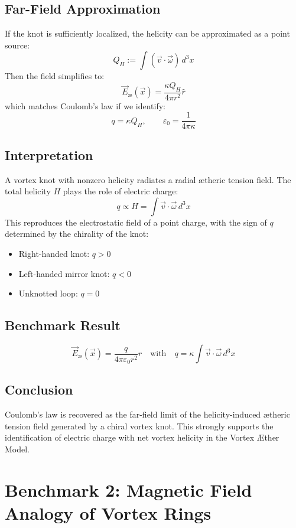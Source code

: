 \documentclass[preprint]{revtex4-2}
\begin{document}
\subsection*{Far-Field Approximation}
If the knot is sufficiently localized, the helicity can be approximated as a point source:
\[
Q_H := \int \left( \vec{v} \cdot \vec{\omega} \right) \, d^3x
\]
Then the field simplifies to:
\[
\vec{E}_\text{\ae}(\vec{x}) = \frac{\kappa Q_H}{4\pi r^2} \hat{r}
\]
which matches Coulomb's law if we identify:
\[
q = \kappa Q_H, \qquad \varepsilon_0 = \frac{1}{4\pi \kappa}
\]

\subsection*{Interpretation}
A vortex knot with nonzero helicity radiates a radial ætheric tension field. The total helicity $H$ plays the role of electric charge:
\[
q \propto H = \int \vec{v} \cdot \vec{\omega} \, d^3x
\]
This reproduces the electrostatic field of a point charge, with the sign of $q$ determined by the chirality of the knot:
\begin{itemize}
    \item Right-handed knot: $q > 0$
    \item Left-handed mirror knot: $q < 0$
    \item Unknotted loop: $q = 0$
\end{itemize}

\subsection*{Benchmark Result}
\[
\boxed{
\vec{E}_\text{\ae}(\vec{x}) =
\frac{q}{4\pi \varepsilon_0 r^2} \hat{r}
\quad \text{with} \quad
q = \kappa \int \vec{v} \cdot \vec{\omega} \, d^3x
}
\]

\subsection*{Conclusion}
Coulomb's law is recovered as the far-field limit of the helicity-induced ætheric tension field generated by a chiral vortex knot. This strongly supports the identification of electric charge with net vortex helicity in the Vortex Æther Model.


\section{Benchmark 2: Magnetic Field Analogy of Vortex Rings}
\end{document}
